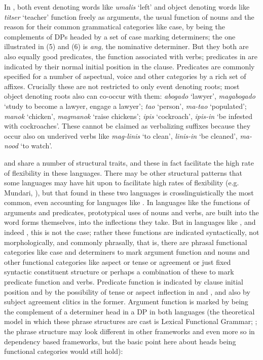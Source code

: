 \documentclass[output=paper]{langsci/langscibook}
\begin{document}
In , both event denoting words like \textit{umalis} ‘left’ and object denoting words like \textit{titser} ‘teacher’ function freely as arguments, the usual function of nouns and the reason for their common grammatical categories like case, by being the complements of DPs headed by a set of case marking determiners; the one illustrated in (5) and (6) is \textit{ang,} the nominative determiner. But they both are also equally good predicates, the function associated with verbs; predicates in  are indicated by their normal initial position in the clause. Predicates are commonly specified for a number of aspectual, voice and other categories by a rich set of affixes. Crucially these are not restricted to only event denoting roots; most object denoting roots also can co-occur with them: \textit{abogado} ‘lawyer’, \textit{magabogado} ‘study to become a lawyer, engage a lawyer’; \textit{tao} ‘person’, \textit{ma-tao} ‘populated’; \textit{manok} ‘chicken’, \textit{magmanok} ‘raise chickens’; \textit{ipis} ‘cockroach’, \textit{ipis-in} ‘be infested with cockroaches’. These cannot be claimed as verbalizing suffixes because they occur also on underived verbs like \textit{mag-linis} ‘to clean’, \textit{linis-in} ‘be cleaned’, \textit{ma-nood} ‘to watch’.

 and  share a number of structural traits, and these in fact facilitate the high rate of flexibility  in these languages. There may be other structural patterns that some languages may have hit upon to facilitate high rates of flexibility (e.g. Mundari, \citealt{EvansEtAl2005mundari}), but that found in these two languages is crosslinguistically the most common, even accounting for languages like . In languages like  the functions of arguments and predicates,   prototypical uses of nouns and verbs, are built into the word forms themselves, into the inflections they take. But in languages like ,  and indeed , this is not the case; rather these functions are indicated syntactically, not morphologically, and commonly phrasally, that is, there are phrasal functional categories like case and determiners to mark argument function and nouns and other functional categories like aspect or tense or agreement or just fixed syntactic constituent structure or perhaps a combination of these to mark predicate function and verbs. Predicate function  is indicated by clause initial position and by the possibility of tense or aspect inflection in  and , and also by subject agreement clitics in the former. Argument  function is marked by being the complement of a determiner head in a DP in both languages (the theoretical model in which these phrase structures are cast is Lexical Functional Grammar; \citealt{Bresnan2001}; the phrase structure   may look different in other frameworks and even more so in dependency based frameworks, but the basic point here about heads being functional categories would still hold):
\end{document}
